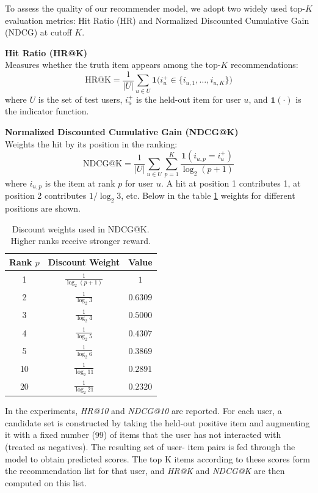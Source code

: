 \documentclass[11pt]{article}
\begin{document}
To assess the quality of our recommender model, we adopt two widely used top-$K$ evaluation metrics: Hit Ratio (HR) and Normalized Discounted Cumulative Gain (NDCG) at cutoff $K$.

\noindent\textbf{Hit Ratio (HR@K)}\\
Measures whether the truth item appears among the top-$K$ recommendations:
\[
  \mathrm{HR@K}
  = \frac{1}{|U|} \sum_{u \in U}
    \mathbf{1}\bigl(i_u^+ \in \{i_{u,1}, \dots, i_{u,K}\}\bigr)
\]
where $U$ is the set of test users, $i_u^+$ is the held-out item for user $u$, and $\mathbf{1}(\cdot)$ is the indicator function.

\medskip
\noindent\textbf{Normalized Discounted Cumulative Gain (NDCG@K)}\\
Weights the hit by its position in the ranking:
\[
  \mathrm{NDCG@K}
  = \frac{1}{|U|} \sum_{u \in U}
    \sum_{p=1}^{K}
      \frac{\mathbf{1}(i_{u,p} = i_u^+)}{\log_2(p+1)}
\]
where $i_{u,p}$ is the item at rank $p$ for user $u$. A hit at position 1 contributes 1, at position 2 contributes $1/\log_2 3$, etc. Below in the table \ref{table:ndcg} weights for different positions are shown.

\begin{table}[H]
\centering
\begin{tabular}{c c c}
\hline
\textbf{Rank $p$} & \textbf{Discount Weight} & \textbf{Value} \\
\hline
1 & $\frac{1}{\log_2(p+1)}$ & $1$ \\
2 & $\frac{1}{\log_2 3}$ & $0.6309$ \\
3 & $\frac{1}{\log_2 4}$ & $0.5000$ \\
4 & $\frac{1}{\log_2 5}$ & $0.4307$ \\
5 & $\frac{1}{\log_2 6}$ & $0.3869$ \\
10 & $\frac{1}{\log_2 11}$ & $0.2891$ \\
20 & $\frac{1}{\log_2 21}$ & $0.2320$ \\
\hline
\end{tabular}
\caption{Discount weights used in NDCG@K. Higher ranks receive stronger reward.}
\label{table:ndcg}
\end{table}


\medskip
In the experiments, \emph{HR@10} and \emph{NDCG@10} are reported. For each user, a candidate set is constructed by taking the held-out positive item and augmenting it with a fixed number (99) of items that the user has not interacted with (treated as negatives). The resulting set of user-   item pairs is fed through the model to obtain predicted scores. The top K items according to these scores form the recommendation list for that user, and \emph{HR@K} and \emph{NDCG@K} are then computed on this list.
\end{document}
